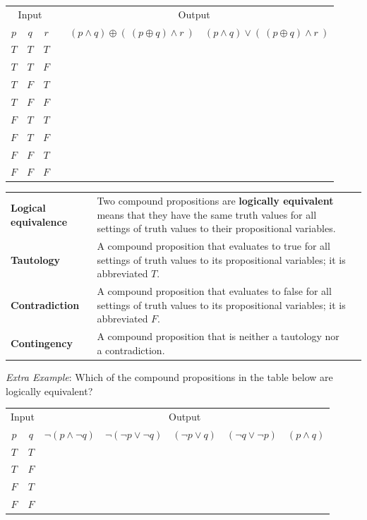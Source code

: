 \documentclass[12pt, oneside]{article}
\begin{document}
\vfill

\begin{center}
\begin{tabular}{ccc||p{3in}|c|c}
\multicolumn{3}{c||}{Input}  & \multicolumn{3}{c}{Output} \\
$p$ & $q$ & $r$  &  &  $(p \land q) \oplus (~ ( p \oplus q) \land r~)$ & $(p \land q) \vee (~ ( p \oplus q) \land r~)$ \\
\hline
$T$ & $T$  & $T$ &   && \\
$T$ & $T$  & $F$ &   && \\
$T$ & $F$  & $T$ &   && \\
$T$ & $F$  & $F$ &   && \\
$F$ & $T$  & $T$ &   && \\
$F$ & $T$  & $F$ &   && \\
$F$ & $F$  & $T$ &   && \\
$F$ & $F$  & $F$ &   && \\
\end{tabular}
\end{center}
\vfill

\newpage
\begin{tabular}{lp{4in}p{2in}}
{\bf Logical equivalence } &Two compound  propositions are {\bf logically  equivalent} means that  they 
have the  same  truth  values for all settings of truth  values to their propositional  variables.\\
{\bf Tautology} & A compound proposition that evaluates to true
for all settings of truth  values to its propositional  variables; it is  abbreviated $T$.\\
{\bf Contradiction} & A compound proposition that  evaluates  to  false 
for  all settings of truth  values to its propositional  variables; it  is abbreviated $F$.\\
{\bf Contingency} & A compound proposition that is neither a tautology nor a contradiction.\\
\end{tabular}

{\it Extra Example}: Which of the  compound propositions in the table below are logically equivalent?
\begin{center}
\begin{tabular}{cc||c|c|c|c|c}
\multicolumn{2}{c||}{Input}  & \multicolumn{5}{c}{Output} \\
$p$ & $q$ & $\lnot (p \land \lnot q)$ & $\lnot (\lnot p  \lor \lnot q)$ &  $(\lnot p \lor  q)$
& $(\lnot q \lor \lnot p)$ & $(p \land q)$  \\
\hline
$T$ & $T$ & &&&&\\
$T$ & $F$ & &&&&\\
$F$ & $T$ & &&&&\\
$F$ & $F$ & &&&&\\
\end{tabular}
\end{center}
\end{document}
